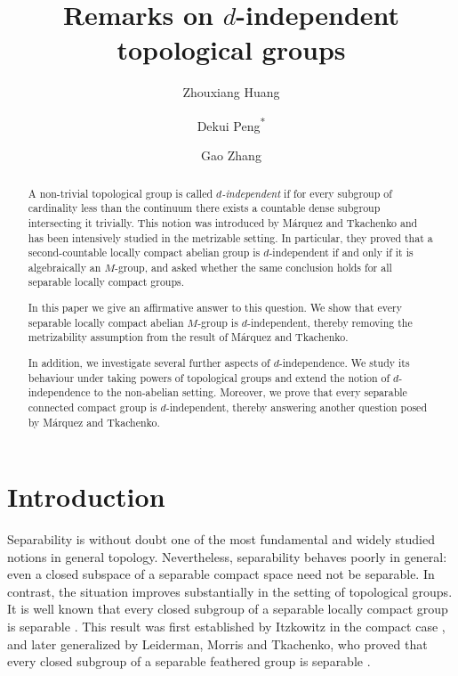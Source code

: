 \documentclass[12pt]{amsart}
\title[$d$-independent topological groups]{Remarks on $d$-independent topological groups}
\author[Z. Huang]{Zhouxiang Huang}
\author[D. Peng]{Dekui Peng\textsuperscript{*}}
\author[G. Zhang]{Gao Zhang}
\theoremstyle{definition}
\theoremstyle{remark}
\begin{document}
\begin{abstract}
A non-trivial topological group is called \emph{$d$-independent} if for every subgroup of cardinality less than the continuum there exists a countable dense subgroup intersecting it trivially.
This notion was introduced by Márquez and Tkachenko and has been intensively studied in the metrizable setting.
In particular, they proved that a second-countable locally compact abelian group is $d$-independent if and only if it is algebraically an $M$-group, and asked whether the same conclusion holds for all separable locally compact groups.

In this paper we give an affirmative answer to this question.
We show that every separable locally compact abelian $M$-group is $d$-independent, thereby removing the metrizability assumption from the result of Márquez and Tkachenko.

In addition, we investigate several further aspects of $d$-independence.
We study its behaviour under taking powers of topological groups and extend the notion of $d$-independence to the non-abelian setting.
Moreover, we prove that every separable connected compact group is $d$-independent, thereby answering another question posed by Márquez and Tkachenko.

\end{abstract}

 
\maketitle


\section{Introduction}
\label{sec0}

Separability is without doubt one of the most fundamental and widely studied notions in general topology. 
Nevertheless, separability behaves poorly in general: even a closed subspace of a separable compact space need not be separable.
In contrast, the situation improves substantially in the setting of topological groups.
It is well known that every closed subgroup of a separable locally compact group is separable \cite{CI}.
This result was first established by Itzkowitz in the compact case \cite{It}, and later generalized by Leiderman, Morris and Tkachenko, who proved that every closed subgroup of a separable feathered group is separable \cite{LMT}.
\end{document}
